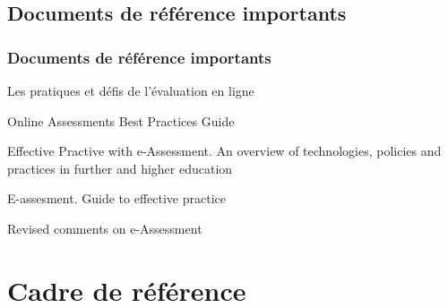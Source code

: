 \documentclass{beamer}
\begin{document}
			\subsection{Documents de référence importants} 
				\begin{frame}[allowframebreaks]
					  \frametitle{Documents de référence importants}
				 		\begin{description}
							\item[Québec] Les pratiques et défis de l'évaluation en ligne \citep{audet2011a}
							\item[États-Unis] Online Assessments Best Practices Guide \citep{NorthCarolina2013}
							\item[Angleterre] Effective Practive with e-Assessment. An overview of technologies, policies and practices in further and higher education \citep{jisc2007a}
							\item[Écosse] E-assesment. Guide to effective practice \citep{authority2014a}
							\framebreak
							\item[ISO] Revised comments on e-Assessment \citep{ISO2008a}
					\end{description}
				\end{frame}
				
		
	\section{Cadre de référence} 
		
\end{document}
